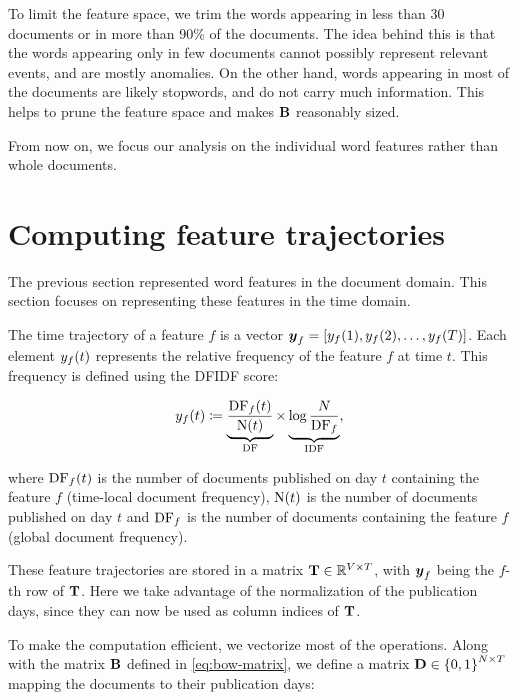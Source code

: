 To limit the feature space, we trim the words appearing in less than 30 documents or in more than 90\% of the documents. The idea behind this is that the words appearing only in few documents cannot possibly represent relevant events, and are mostly anomalies. On the other hand, words appearing in most of the documents are likely stopwords, and do not carry much information. This helps to prune the feature space and makes $\mathbf{B}$ reasonably sized.

From now on, we focus our analysis on the individual word features rather than whole documents.


\section{Computing feature trajectories}
The previous section represented word features in the document domain. This section focuses on representing these features in the time domain.

The time trajectory of a feature $f$ is a vector $\vect{\traj}_f = \left[ \traj_{f}(1), \traj_{f}(2), \dots, \traj_{f}(\streamlen) \right]$. Each element $y_{f}(t)$ represents the relative frequency of the feature $f$ at time $t$. This frequency is defined using the DFIDF score:

\begin{equation}
	y_{f}(t) \coloneqq \underbrace{\frac{\text{DF}_{f}(t)}{\text{N}(t)}}_{\text{DF}} \times \underbrace{\log{\frac{N}{\text{DF}_{f}}}}_{\text{IDF}},
\end{equation}

where $\text{DF}_{f}(t)$ is the number of documents published on day $t$ containing the feature $f$ (time-local document frequency), $\text{N}(t)$ is the number of documents published on day $t$ and $\text{DF}_{f}$ is the number of documents containing the feature $f$ (global document frequency).

These feature trajectories are stored in a matrix $\mathbf{T} \in \mathbb{R}^{V \times T}$, with $\vect{\traj}_f$ being the $f$-th row of $\mathbf{T}$. Here we take advantage of the normalization of the publication days, since they can now be used as column indices of $\mathbf{T}$.

To make the computation efficient, we vectorize most of the operations. Along with the matrix $\mathbf{B}$ defined in \ref{eq:bow-matrix}, we define a matrix $\mathbf{D} \in \left\{ 0, 1 \right\}^{N \times T}$ mapping the documents to their publication days:


